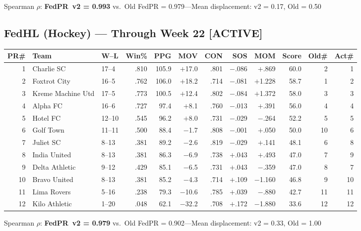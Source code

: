 \documentclass[11pt,a4paper]{article}
\begin{document}
\noindent Spearman $\rho$: \textbf{FedPR~v2 = 0.993} vs.\ Old FedPR = 0.979\quad---\quad Mean displacement: v2 = 0.17, Old = 0.50

\subsection{FedHL (Hockey) --- Through Week 22 [ACTIVE]}

\begin{table}[H]
\centering\small
\begin{tabular}{@{}rl l r r r r r r r r r@{}}
\toprule
\textbf{PR\#} & \textbf{Team} & \textbf{W--L} & \textbf{Win\%} & \textbf{PPG} & \textbf{MOV} & \textbf{CON} & \textbf{SOS} & \textbf{MOM} & \textbf{Score} & \textbf{Old\#} & \textbf{Act\#}\\
\midrule
1 & Charlie SC & 17--4 & .810 & 105.9 & $+$17.0 & .801 & $-$.086 & $+$.869 & 60.0 & 2 & 1\\
2 & Foxtrot City & 16--5 & .762 & 106.0 & $+$18.2 & .714 & $-$.081 & $+$1.228 & 58.7 & 1 & 2\\
3 & Kreme Machine Utd & 17--5 & .773 & 100.5 & $+$12.4 & .802 & $-$.084 & $+$1.372 & 58.0 & 3 & 3\\
4 & Alpha FC & 16--6 & .727 & 97.4 & $+$8.1 & .760 & $-$.013 & $+$.391 & 56.0 & 4 & 4\\
5 & Hotel FC & 12--10 & .545 & 96.2 & $+$8.0 & .731 & $-$.029 & $-$.264 & 52.2 & 5 & 5\\
6 & Golf Town & 11--11 & .500 & 88.4 & $-$1.7 & .808 & $-$.001 & $+$.050 & 50.0 & 10 & 6\\
7 & Juliet SC & 8--13 & .381 & 89.2 & $-$2.6 & .819 & $-$.029 & $+$.141 & 48.1 & 6 & 8\\
8 & India United & 8--13 & .381 & 86.3 & $-$6.9 & .738 & $+$.043 & $+$.493 & 47.0 & 7 & 9\\
9 & Delta Athletic & 9--12 & .429 & 85.1 & $-$6.5 & .731 & $+$.043 & $-$.359 & 47.0 & 8 & 7\\
10 & Bravo United & 8--13 & .381 & 85.2 & $-$4.3 & .714 & $+$.109 & $-$1.160 & 46.8 & 9 & 10\\
11 & Lima Rovers & 5--16 & .238 & 79.3 & $-$10.6 & .785 & $+$.039 & $-$.880 & 42.7 & 11 & 11\\
12 & Kilo Athletic & 1--20 & .048 & 62.1 & $-$32.2 & .708 & $+$.172 & $-$1.880 & 33.6 & 12 & 12\\
\bottomrule
\end{tabular}
\end{table}

\noindent Spearman $\rho$: \textbf{FedPR~v2 = 0.979} vs.\ Old FedPR = 0.902\quad---\quad Mean displacement: v2 = 0.33, Old = 1.00
\end{document}
